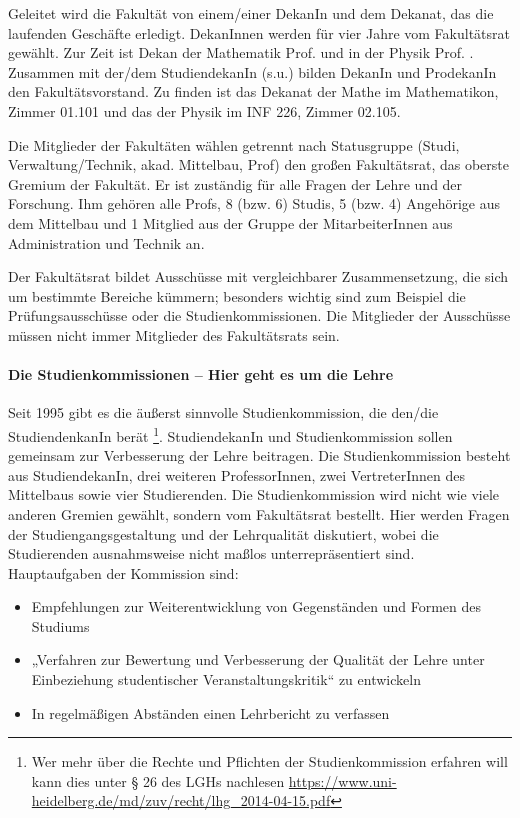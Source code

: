 Geleitet wird die Fakultät von einem/einer DekanIn und dem Dekanat, das die
laufenden Geschäfte erledigt. DekanInnen werden für vier Jahre vom Fakultätsrat
gewählt. Zur Zeit ist Dekan der Mathematik Prof. \dekanmathe{} und in der
Physik Prof. \dekanphysik. Zusammen mit der/dem StudiendekanIn (s.u.) bilden
DekanIn und ProdekanIn den Fakultätsvorstand. Zu finden ist das Dekanat der
Mathe im \Gls{Mathematikon}, Zimmer 01.101 und das der Physik im INF 226,
Zimmer 02.105.

Die Mitglieder der Fakultäten wählen getrennt nach Statusgruppe (Studi,
Verwaltung/Technik, akad. Mittelbau, Prof) den großen Fakultätsrat, das oberste
Gremium der Fakultät. Er ist zuständig für alle Fragen der Lehre und der
Forschung. Ihm gehören alle Profs, 8 (bzw. 6) Studis, 5 (bzw. 4) Angehörige aus
dem Mittelbau und 1 Mitglied aus der Gruppe der MitarbeiterInnen aus
Administration und Technik an.

Der Fakultätsrat bildet Ausschüsse mit vergleichbarer Zusammensetzung, die sich
um bestimmte Bereiche kümmern; besonders wichtig sind zum Beispiel die
Prüfungsausschüsse oder die Studienkommissionen. Die Mitglieder der Ausschüsse
müssen nicht immer Mitglieder des Fakultätsrats sein.


\paragraph{Die Studienkommissionen -- Hier geht es um die Lehre}

Seit 1995 gibt es die äußerst sinnvolle Studienkommission, die den/die
StudiendenkanIn berät \footnote{Wer mehr über die Rechte und Pflichten der
Studienkommission erfahren will kann dies unter § 26 des LGHs nachlesen
\url{https://www.uni-heidelberg.de/md/zuv/recht/lhg_2014-04-15.pdf}}.
StudiendekanIn und Studienkommission sollen gemeinsam zur Verbesserung der
Lehre beitragen. Die Studienkommission besteht aus StudiendekanIn, drei
weiteren ProfessorInnen, zwei VertreterInnen des Mittelbaus sowie vier
Studierenden. Die Studienkommission wird nicht wie viele anderen Gremien
gewählt, sondern vom Fakultätsrat bestellt. Hier werden Fragen der
Studiengangsgestaltung und der Lehrqualität diskutiert, wobei die Studierenden
ausnahmsweise nicht maßlos unterrepräsentiert sind. Hauptaufgaben der
Kommission sind:
\begin{itemize}
    \addtolength{\itemsep}{-0.7\baselineskip}
    \item Empfehlungen zur Weiterentwicklung von Gegenständen und Formen des Studiums
    \item „Verfahren zur Bewertung und Verbesserung der Qualität der Lehre unter
          Einbeziehung studentischer Veranstaltungskritik“ zu entwickeln
    \item In regelmäßigen Abständen einen Lehrbericht zu verfassen
\end{itemize}

